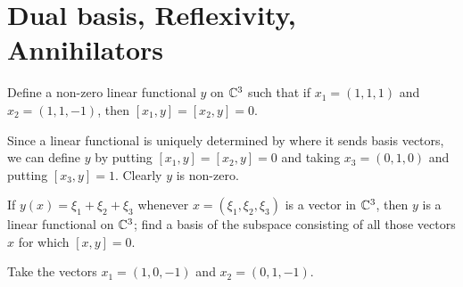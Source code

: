 \section{Dual basis, Reflexivity, Annihilators}

\begin{problem}
  Define a non-zero linear functional $y$ on $\mathbb{C}^3$ such that if $x_1 = (1, 1, 1)$ and $x_2 = (1, 1, -1)$, then $[x_1, y] = [x_2, y] = 0$.
\end{problem}

\begin{solution}
  Since a linear functional is uniquely determined by where it sends basis vectors, we can define $y$ by putting $[x_1, y] = [x_2, y] = 0$ and taking $x_3 = (0, 1, 0)$ and putting $[x_3, y] = 1$.
  Clearly $y$ is non-zero.
\end{solution}

\setcounter{problem}{3}
\begin{problem}
  If $y(x) = \xi_1 + \xi_2 + \xi_3$ whenever $x = (\xi_1, \xi_2, \xi_3)$ is a vector in $\mathbb{C}^3$, then $y$ is a linear functional on $\mathbb{C}^3$;
  find a basis of the subspace consisting of all those vectors $x$ for which $[x, y] = 0$.
\end{problem}

\begin{solution}
  Take the vectors $x_1 = (1, 0, -1)$ and $x_2 = (0, 1, -1)$.
\end{solution}
